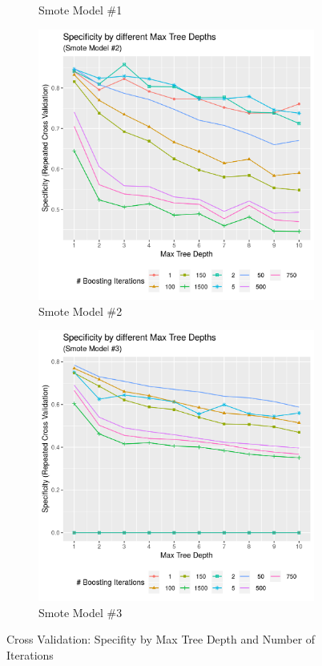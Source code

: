 \documentclass[12pt,a4paper]{article}
\begin{document}
\begin{appendices}
\begin{figure}[h!]
\begin{subfigure}{0.48\textwidth}
\caption{Smote Model \#1} \label{fig:a}
\end{subfigure}
\begin{subfigure}{0.48\textwidth}
\includegraphics[width=\linewidth]{./graphics/cv/Spec_by_treeDepth_smote2.png}
\caption{Smote Model \#2} \label{fig:a}
\end{subfigure}\hspace*{\fill}
\begin{subfigure}{0.48\textwidth}
\includegraphics[width=\linewidth]{./graphics/cv/Spec_by_treeDepth_smote3.png}
\caption{Smote Model \#3} \label{fig:a}
\end{subfigure}
\caption{Cross Validation: Specifity by Max Tree Depth and Number of Iterations}
\end{figure}
\pagebreak
\clearpage

\end{appendices}
\end{document}
